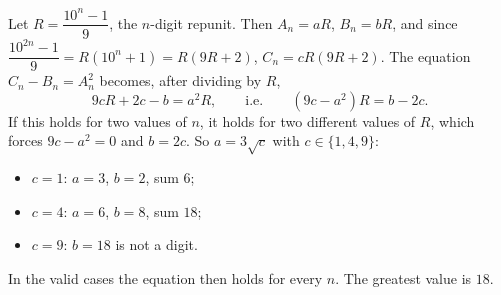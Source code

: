 Let $R=\dfrac{10^n-1}{9}$, the $n$-digit repunit. Then $A_n=aR$, $B_n=bR$, and since $\dfrac{10^{2n}-1}9=R\left(10^n+1\right)=R(9R+2)$, $C_n=cR(9R+2)$. The equation $C_n-B_n=A_n^2$ becomes, after dividing by $R$,
\[9cR+2c-b=a^2R,\qquad\text{i.e.}\qquad\left(9c-a^2\right)R=b-2c.\]
If this holds for two values of $n$, it holds for two different values of $R$, which forces $9c-a^2=0$ and $b=2c$. So $a=3\sqrt c$ with $c\in\{1,4,9\}$:
\begin{itemize}
\item $c=1$: $a=3$, $b=2$, sum $6$;
\item $c=4$: $a=6$, $b=8$, sum $18$;
\item $c=9$: $b=18$ is not a digit.
\end{itemize}
In the valid cases the equation then holds for every $n$. The greatest value is $\boxed{18}$.
